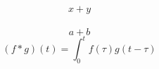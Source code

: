 \documentclass{article}
\begin{document}
\[   x + y      \] \\
\[     a + b    \]
\[ (f * g)(t) = \int_0^t f(\tau)g(t-\tau) \]


\end{document}
